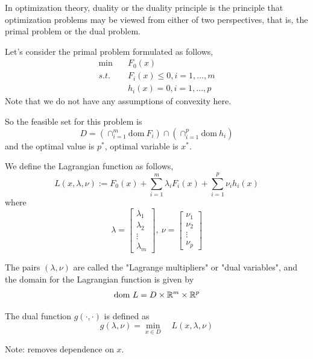 
In optimization theory, duality or the duality principle is the principle that optimization problems may be viewed from either of two perspectives, that is, the primal problem or the dual problem.

Let's consider the primal problem formulated as follows,
\begin{align*}
	\min \quad&F_0(x) \\
	s.t. \quad&F_i(x)\leq 0, i = 1,...,m\\
	&h_i(x)= 0, i = 1,...,p
\end{align*}
Note that we do not have any assumptions of convexity here.

So the feasible set for this problem is
$$D = (\cap^m_{i=1}\text{dom}\ F_i)\cap(\cap^p_{i=1}\text{dom}\ h_i)$$ 
and the optimal value is $p^*$, optimal variable is $x^*$.

\begin{definition}
	We define the Lagrangian function as follows,
	$$L(x,\lambda,\nu) := F_0(x) + \sum^m_{i=1}\lambda_i F_i(x) + \sum^p_{i=1}\nu_i h_i(x)$$
	where
	$$\lambda =
	\begin{bmatrix}
	\lambda_1\\
	\lambda_2\\
	\vdots\\
	\lambda_m
	\end{bmatrix},\
	\nu = 
	\begin{bmatrix}
	\nu_1\\
	\nu_2\\
	\vdots\\
	\nu_p
	\end{bmatrix}$$
	
	The pairs $(\lambda, \nu)$ are called the "Lagrange multipliers" or "dual variables", and the domain for the Lagrangian function is given by 
	$$\text{dom}\ L = D\times \mathbb{R}^m \times \mathbb{R}^p$$
\end{definition}

\begin{definition}
	The dual function $g(\cdot, \cdot)$ is defined as 
	\begin{equation*}
		g(\lambda, \nu) = \min_{x\in D}\quad L(x,\lambda,\nu)
	\end{equation*}
	
	Note: removes dependence on $x$.
\end{definition}


